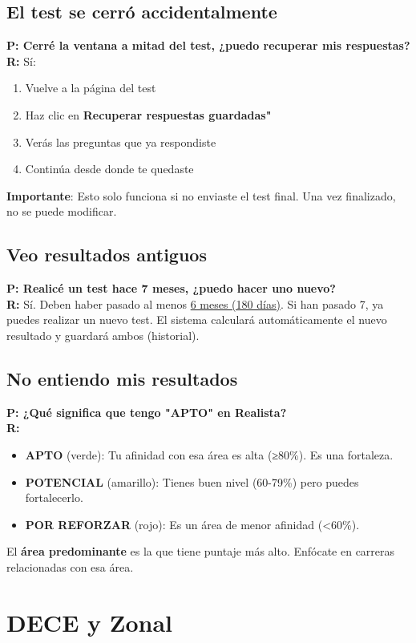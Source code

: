 \documentclass[12pt, a4paper]{report}
\begin{document}
\subsection{El test se cerró accidentalmente}
\textbf{P: Cerré la ventana a mitad del test, ¿puedo recuperar mis respuestas?}\\
\textbf{R:} Sí:
\begin{enumerate}
    \item Vuelve a la página del test
    \item Haz clic en \textbf{Recuperar respuestas guardadas"}
    \item Verás las preguntas que ya respondiste
    \item Continúa desde donde te quedaste
\end{enumerate}
\textbf{Importante}: Esto solo funciona si no enviaste el test final. Una vez finalizado, no se puede modificar.

\subsection{Veo resultados antiguos}
\textbf{P: Realicé un test hace 7 meses, ¿puedo hacer uno nuevo?}\\
\textbf{R:} Sí. Deben haber pasado al menos \underline{6 meses (180 días)}. Si han pasado 7, ya puedes realizar un nuevo test. El sistema calculará automáticamente el nuevo resultado y guardará ambos (historial).

\subsection{No entiendo mis resultados}
\textbf{P: ¿Qué significa que tengo "APTO" en Realista?}\\
\textbf{R:}
\begin{itemize}
    \item \textbf{APTO} (verde): Tu afinidad con esa área es alta (≥80\%). Es una fortaleza.
    \item \textbf{POTENCIAL} (amarillo): Tienes buen nivel (60-79\%) pero puedes fortalecerlo.
    \item \textbf{POR REFORZAR} (rojo): Es un área de menor afinidad (<60\%).
\end{itemize}
El \textbf{área predominante} es la que tiene puntaje más alto. Enfócate en carreras relacionadas con esa área.

\section{DECE y Zonal}
\end{document}
